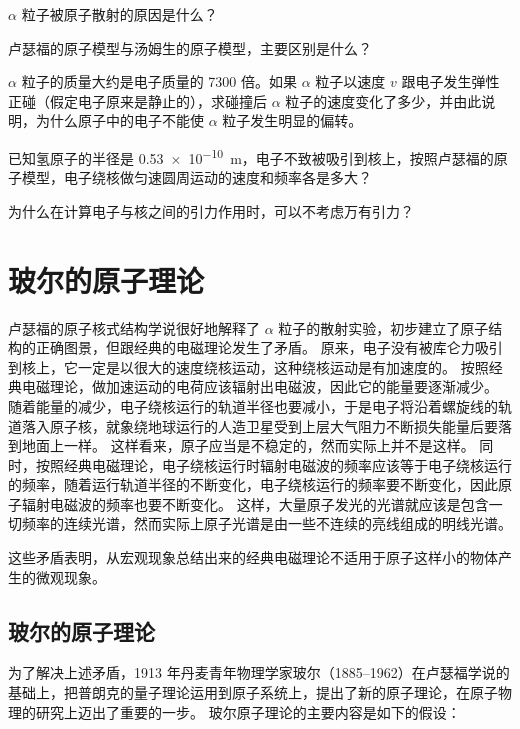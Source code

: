 \begin{Practice}
\begin{question}
  \item $\alpha$ 粒子被原子散射的原因是什么？
  \item 卢瑟福的原子模型与汤姆生的原子模型，主要区别是什么？
  \item $\alpha$ 粒子的质量大约是电子质量的 7300 倍。如果 $\alpha$ 粒子以速度 $v$ 跟电子发生弹性正碰（假定电子原来是静止的），求碰撞后 $\alpha$ 粒子的速度变化了多少，并由此说明，为什么原子中的电子不能使 $\alpha$ 粒子发生明显的偏转。
  \item 已知氢原子的半径是 \qty{0.53e-10}{m}，电子不致被吸引到核上，按照卢瑟福的原子模型，电子绕核做匀速圆周运动的速度和频率各是多大？
  \item 为什么在计算电子与核之间的引力作用时，可以不考虑万有引力？
\end{question}
\end{Practice}

\section{玻尔的原子理论}\label{sec:Bohr_theory}
卢瑟福的原子核式结构学说很好地解释了 $\alpha$ 粒子的散射实验，初步建立了原子结构的正确图景，但跟经典的电磁理论发生了矛盾。
原来，电子没有被库仑力吸引到核上，它一定是以很大的速度绕核运动，这种绕核运动是有加速度的。
按照经典电磁理论，做加速运动的电荷应该辐射出电磁波，因此它的能量要逐渐减少。
随着能量的减少，电子绕核运行的轨道半径也要减小，于是电子将沿着螺旋线的轨道落入原子核，就象绕地球运行的人造卫星受到上层大气阻力不断损失能量后要落到地面上一样。
这样看来，原子应当是不稳定的，然而实际上并不是这样。
同时，按照经典电磁理论，电子绕核运行时辐射电磁波的频率应该等于电子绕核运行的频率，随着运行轨道半径的不断变化，电子绕核运行的频率要不断变化，因此原子辐射电磁波的频率也要不断变化。
这样，大量原子发光的光谱就应该是包含一切频率的连续光谱，然而实际上原子光谱是由一些不连续的亮线组成的明线光谱。

这些矛盾表明，从宏观现象总结出来的经典电磁理论不适用于原子这样小的物体产生的微观现象。

\subsection{玻尔的原子理论} 
为了解决上述矛盾，1913 年丹麦青年物理学家玻尔（1885--1962）在卢瑟福学说的基础上，把普朗克的量子理论运用到原子系统上，提出了新的原子理论，在原子物理的研究上迈出了重要的一步。
玻尔原子理论的主要内容是如下的假设：

